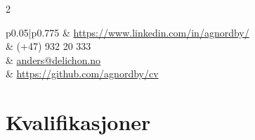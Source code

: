 \documentclass[10pt]{article} %
\begin{document}
\begin{paracol}{2}

\parbox[top][0.12\textheight][c]{\linewidth}{ %
	\vspace{-0.04\textheight} %
	\colorbox{shade}{ %
		\begin{supertabular}{p{0.05\linewidth}|p{0.775\linewidth}} %
			\raisebox{-1pt}{\faLinkedinSquare} & \href{https://www.linkedin.com/in/agnordby/}{https://www.linkedin.com/in/agnordby/} \\ %
			\raisebox{-1pt}{\faPhone} & (+47) 932 20 333 \\ %
			\raisebox{0pt}{\small\faEnvelope} & \href{mailto:anders@delichon.no}{anders@delichon.no} \\ %
			\raisebox{-1pt}{\faGithub} & \href{https://https://github.com/agnordby/cv}{https://github.com/agnordby/cv} \\ %

		\end{supertabular}
	}
}


\section{Kvalifikasjoner}



\end{paracol}
\end{document}
